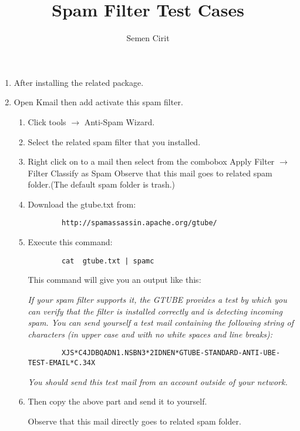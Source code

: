 \documentclass[a4paper,10pt]{article}
\title{Spam Filter Test Cases}
\author{Semen Cirit}
\begin{document}
\maketitle

\begin{enumerate}
	\item After installing the related package.
	\item Open Kmail then add activate this spam filter.
		
	\begin{enumerate}
		\item Click tools $\rightarrow$  Anti-Spam Wizard.
		\item Select the related spam filter that you installed.
		\item Right click on to a mail then select from the combobox Apply Filter $\rightarrow$ Filter Classify as Spam 
		Observe that this mail goes to related spam folder.(The default spam folder is trash.)
		\item Download the gtube.txt from: 
		\begin{verbatim}
 		http://spamassassin.apache.org/gtube/
		\end{verbatim}
		\item  Execute this command:
		\begin{verbatim}
 		cat  gtube.txt | spamc 
		\end{verbatim}
		
		This command will give you an output like this:
		
		\emph{If your spam filter supports it, the GTUBE provides a test by which you
	    	can verify that the filter is installed correctly and is detecting incoming
    		spam. You can send yourself a test mail containing the following string of
    		characters (in upper case and with no white spaces and line breaks):}
		\begin{verbatim}
 		XJS*C4JDBQADN1.NSBN3*2IDNEN*GTUBE-STANDARD-ANTI-UBE-TEST-EMAIL*C.34X
		\end{verbatim}
    		\emph{You should send this test mail from an account outside of your network.}

		\item Then copy the above part and send it to yourself.
		
		Observe that this mail directly goes to related spam folder.
	\end{enumerate} 
 


\end{enumerate}
\end{document}
